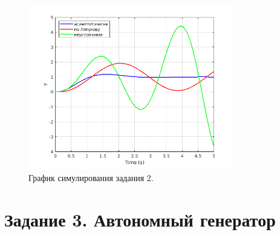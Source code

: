 \begin{figure}
    \centering
    \includegraphics[width=0.8\textwidth]{figs/task_2_out_1.png}
    \caption{График симулирования задания 2.}
    \label{fig:task_2_out_1}
\end{figure}



\section*{Задание 3. Автономный генератор}

